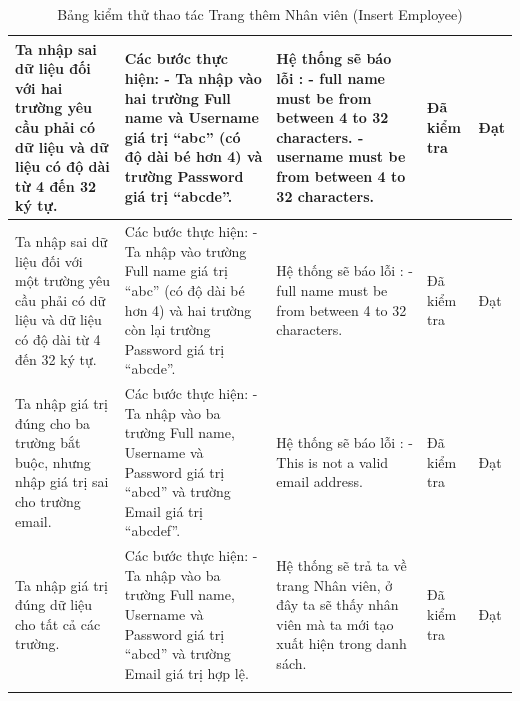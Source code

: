 \documentclass{article}
\begin{document}
\begin{longtable}{ | p{} |p{} | p{}  | p{}  | p{}  | }
\hline
Ta nhập sai dữ liệu đối với hai trường yêu cầu phải có dữ liệu và dữ liệu có độ dài từ 4 đến 32 ký tự.
&
Các bước thực hiện: \newline
- Ta nhập vào hai trường Full name và Username giá trị “abc” (có độ dài bé hơn 4) và trường Password giá trị “abcde”. 
&
Hệ thống sẽ báo lỗi : \newline
- full name must be from between 4 to 32 characters. \newline
- username must be from between 4 to 32 characters.
&
Đã kiểm tra &
Đạt \\

\hline
Ta nhập sai dữ liệu đối với một trường yêu cầu phải có dữ liệu và dữ liệu có độ dài từ 4 đến 32 ký tự.
&
Các bước thực hiện: \newline
- Ta nhập vào trường Full name giá trị “abc” (có độ dài bé hơn 4) và hai trường còn lại trường Password giá trị “abcde”.  
&
Hệ thống sẽ báo lỗi : \newline
- full name must be from between 4 to 32 characters.
&
Đã kiểm tra &
Đạt \\

\hline
Ta nhập giá trị đúng cho ba trường bắt buộc, nhưng nhập giá trị sai cho trường email.
&
Các bước thực hiện: \newline
- Ta nhập vào ba trường Full name, Username và Password giá trị “abcd” và trường Email giá trị “abcdef”.  
&
Hệ thống sẽ báo lỗi : \newline
- This is not a valid email address.
&
Đã kiểm tra &
Đạt \\

\hline
Ta nhập giá trị đúng dữ liệu cho tất cả các trường.
&
Các bước thực hiện: \newline
- Ta nhập vào ba trường Full name, Username và Password giá trị “abcd” và trường Email giá trị hợp lệ.  
&
Hệ thống sẽ trả ta về trang Nhân viên, ở đây ta sẽ thấy nhân viên mà ta mới tạo xuất hiện trong danh sách.
&
Đã kiểm tra &
Đạt \\

\hline
\caption{Bảng kiểm thử thao tác Trang thêm Nhân viên (Insert Employee)}
\end{longtable}

\end{document}

